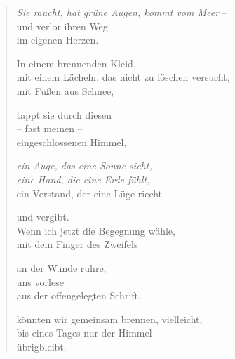
\cleartorecto


\begin{verse}

\emph{Sie raucht, hat grüne Augen, kommt vom Meer} --\label{marina-autobio}\\
und verlor ihren Weg\\
im eigenen Herzen.

In einem brennenden Kleid,\\
mit einem Lächeln, das nicht zu löschen versucht,\\
mit Füßen aus Schnee,

tappt sie durch diesen\\
-- fast meinen --\\
eingeschlossenen Himmel,

\emph{ein Auge, das eine Sonne sieht,\\
eine Hand, die eine Erde fühlt,}\label{schop-die-welt}\\
ein Verstand, der eine Lüge riecht

und vergibt.\\
Wenn ich jetzt die Begegnung wähle,\\
mit dem Finger des Zweifels

an der Wunde rühre,\\
uns vorlese\\
aus der offengelegten Schrift,

könnten wir gemeinsam brennen, vielleicht,\\
bis eines Tages nur der Himmel\\
übrigbleibt.

\end{verse}

\cleartoverso



